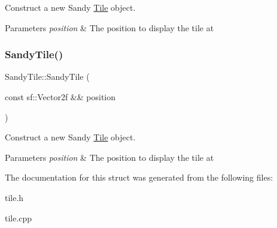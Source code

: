 Construct a new Sandy \mbox{\hyperlink{classTile}{Tile}} object. 


\begin{DoxyParams}{Parameters}
{\em position} & The position to display the tile at \\
\hline
\end{DoxyParams}
\mbox{\label{structSandyTile_abf3581d4b2dbb27675ed3f1eab38324d}} 
\subsubsection{\texorpdfstring{SandyTile()}{SandyTile()}\hspace{0.1cm}{\footnotesize\ttfamily [2/2]}}
{\footnotesize\ttfamily Sandy\+Tile\+::\+Sandy\+Tile (\begin{DoxyParamCaption}\item[{const sf\+::\+Vector2f \&\&}]{position }\end{DoxyParamCaption})\hspace{0.3cm}{\ttfamily [explicit]}}



Construct a new Sandy \mbox{\hyperlink{classTile}{Tile}} object. 


\begin{DoxyParams}{Parameters}
{\em position} & The position to display the tile at \\
\hline
\end{DoxyParams}


The documentation for this struct was generated from the following files\+:\begin{DoxyCompactItemize}
\item 
tile.\+h\item 
tile.\+cpp\end{DoxyCompactItemize}
